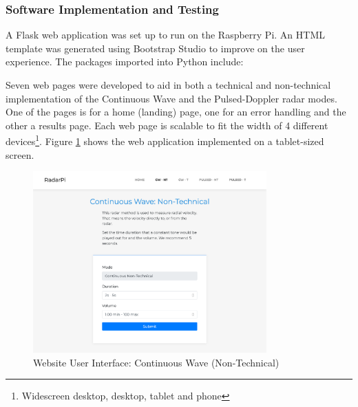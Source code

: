 \subsubsection{Software Implementation and Testing}

A Flask web application was set up to run on the Raspberry Pi. An HTML template was generated using Bootstrap Studio to improve on the user experience. The packages imported into Python include:


Seven web pages were developed to aid in both a technical and non-technical implementation of the Continuous Wave and the Pulsed-Doppler radar modes. One of the pages is for a home (landing) page, one for an error handling and the other a results page. Each web page is scalable to fit the width of 4 different devices\footnote{Widescreen desktop, desktop, tablet and phone}. Figure \ref{fig:website1} shows the web application implemented on a tablet-sized screen.

\begin{figure}[h!]
    \centering
    \includegraphics[width = 0.8\textwidth]{images/website1.pdf}
    \caption{Website User Interface: Continuous Wave (Non-Technical)}\label{fig:website1}
\end{figure}

